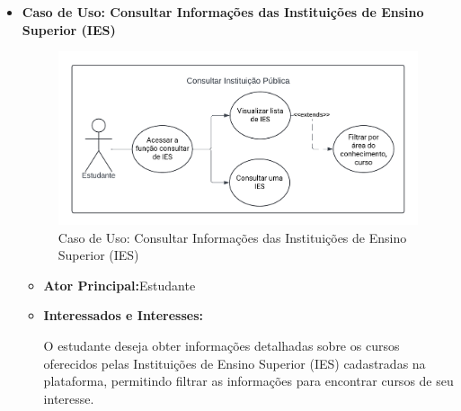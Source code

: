 \begin{itemize}
    \item \textbf{Caso de Uso: Consultar Informações das Instituições de Ensino Superior (IES)}

    \begin{figure}[ht]
        \centering
        \includegraphics[scale=0.8]{caso-de-uso_consultar-ies.png}
        \caption{Caso de Uso: Consultar Informações das Instituições de Ensino Superior (IES)}
        \label{fig:enter-label}
    \end{figure}

    \begin{itemize}
        \item \textbf{Ator Principal:}Estudante
        \item \textbf{Interessados e Interesses:}

        O estudante deseja obter informações detalhadas sobre os cursos oferecidos pelas Instituições de Ensino Superior (IES) cadastradas na plataforma, permitindo filtrar as informações para encontrar cursos de seu interesse.


\end{itemize}
\end{itemize}
